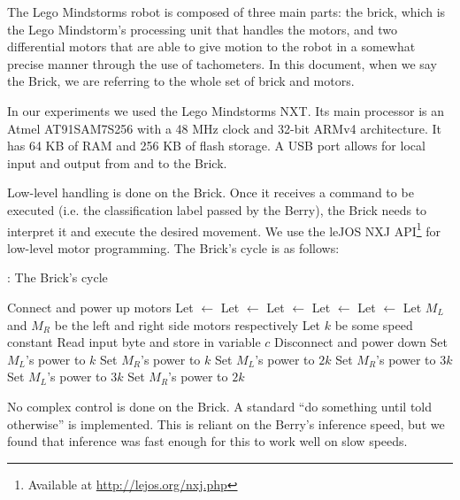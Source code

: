 The Lego Mindstorms robot is composed of three main parts: the brick, which is the Lego Mindstorm's
processing unit that handles the motors, and two differential motors that are able to give motion
to the robot in a somewhat precise manner through the use of tachometers. In this document, when we
say the Brick, we are referring to the whole set of brick and motors.

In our experiments we used the Lego Mindstorms NXT. Its main processor is an Atmel AT91SAM7S256
with a 48 MHz clock and 32-bit ARMv4 architecture. It has 64 KB of RAM and 256 KB of flash storage.
A USB port allows for local input and output from and to the Brick.

Low-level handling is done on the Brick. Once it receives a command to be executed (i.e. the
classification label passed by the Berry), the Brick needs to interpret it and execute the desired
movement. We use the leJOS NXJ API\footnote{Available at \url{http://lejos.org/nxj.php}} for
low-level motor programming. The Brick's cycle is as follows:

\begin{algorithm}[H]
  \caption{: The Brick's cycle}
  \begin{algorithmic}[1]
    \State Connect and power up motors
    \State Let  $\gets$ 
    \State Let  $\gets$ 
    \State Let  $\gets$ 
    \State Let  $\gets$ 
    \State Let  $\gets$ 
    \State Let $M_L$ and $M_R$ be the left and right side motors respectively
    \State Let $k$ be some speed constant
        \State Read input byte and store in variable $c$
          \State Disconnect and power down
          \State Set $M_L$'s power to $k$
          \State Set $M_R$'s power to $k$
          \State Set $M_L$'s power to $2k$
          \State Set $M_R$'s power to $3k$
          \State Set $M_L$'s power to $3k$
          \State Set $M_R$'s power to $2k$
        \EndIf%
      \EndIf%
    \EndWhile%
  \end{algorithmic}
\end{algorithm}

No complex control is done on the Brick. A standard ``do something until told otherwise'' is
implemented. This is reliant on the Berry's inference speed, but we found that inference was fast
enough for this to work well on slow speeds.

